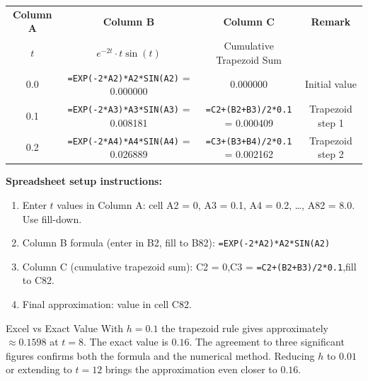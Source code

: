 \documentclass[12pt,a4paper]{article}
\begin{document}
\begin{center}
\begin{tabular}{@{}c c c c@{}}
\toprule
\textbf{Column A} & \textbf{Column B} & \textbf{Column C}
                  & \textbf{Remark} \\
$t$ & $e^{-2t}\cdot t\sin(t)$ & Cumulative Trapezoid Sum & \\
\midrule
0.0 & \texttt{=EXP(-2*A2)*A2*SIN(A2)} = 0.000000 &
  0.000000 & Initial value \\
0.1 & \texttt{=EXP(-2*A3)*A3*SIN(A3)} = 0.008181 &
  \texttt{=C2+(B2+B3)/2*0.1} = 0.000409 & Trapezoid step 1 \\
0.2 & \texttt{=EXP(-2*A4)*A4*SIN(A4)} = 0.026889 &
  \texttt{=C3+(B3+B4)/2*0.1} = 0.002162 & Trapezoid step 2 \\
\bottomrule
\end{tabular}
\end{center}

\textbf{Spreadsheet setup instructions:}
\begin{enumerate}
  \item Enter $t$ values in Column A: cell A2 = 0, A3 = 0.1, A4 = 0.2,
        \ldots, A82 = 8.0. Use fill-down.
  \item Column B formula (enter in B2, fill to B82):
        \texttt{=EXP(-2*A2)*A2*SIN(A2)}
  \item Column C (cumulative trapezoid sum):
        C2 = 0,\quad C3 = \texttt{=C2+(B2+B3)/2*0.1},\quad fill to C82.
  \item Final approximation: value in cell C82.
\end{enumerate}

\begin{learnbox}{Excel vs Exact Value}
With $h=0.1$ the trapezoid rule gives approximately $\approx 0.1598$ at $t=8$.
The exact value is $0.16$. The agreement to three significant figures confirms
both the formula and the numerical method. Reducing $h$ to $0.01$ or extending
to $t=12$ brings the approximation even closer to $0.16$.
\end{learnbox}

\end{document}
